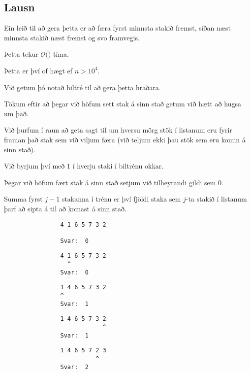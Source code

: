 \subsection{Lausn}
{
    {
        \item<1-> Ein leið til að gera þetta er að færa fyrst minnsta stakið fremst, síðan næst minnsta stakið næst fremst og svo framvegis.
        \item<2-> Þetta tekur $\mathcal{O}($$)$ tíma.
        \item<4-> Þetta er því of hægt ef $n > 10^4$.
        \item<5-> Við getum þó notað biltré til að gera þetta hraðara.
        \item<6-> Tökum eftir að þegar við höfum sett stak á sinn stað getum við hætt að hugsa um það.
        \item<7-> Við þurfum í raun að geta sagt til um hversu mörg stök í listanum eru fyrir framan það stak sem við viljum færa
                (við teljum ekki þau stök sem eru komin á sinn stað).
        \item<8-> Við byrjum því með $1$ í hverju staki í biltrénu okkar.
        \item<9-> Þegar við höfum fært stak á sinn stað setjum við tilheyrandi gildi sem $0$.
        \item<10-> Summa fyrst $j - 1$ stakanna í trénu er því fjöldi staka sem $j$-ta stakið í listanum þarf að sipta á til að komast á sinn stað.
    }
}
{ \begin{verbatim}
                4 1 6 5 7 3 2

                Svar:  0
\end{verbatim}}
{ \begin{verbatim}
                4 1 6 5 7 3 2
                  ^
                Svar:  0
\end{verbatim}}
{ \begin{verbatim}
                1 4 6 5 7 3 2
                ^
                Svar:  1
\end{verbatim}}
{ \begin{verbatim}
                1 4 6 5 7 3 2
                            ^
                Svar:  1
\end{verbatim}}
{ \begin{verbatim}
                1 4 6 5 7 2 3
                          ^
                Svar:  2
\end{verbatim}}
